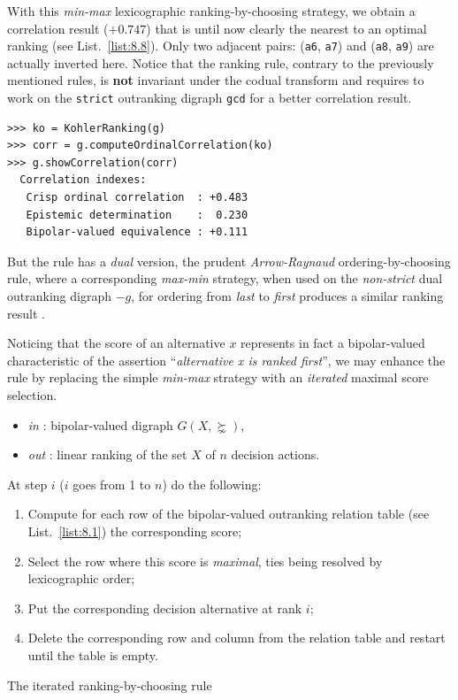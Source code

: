 With this \emph{min-max} lexicographic ranking-by-choosing strategy, we obtain a correlation result ($+0.747$) that is until now clearly the nearest to an optimal \Kemeny ranking (see List.~\vref{list:8.8}). Only two adjacent pairs: (\texttt{a6}, \texttt{a7}) and (\texttt{a8}, \texttt{a9}) are actually inverted here. Notice that the \Kohler ranking rule, contrary to the previously mentioned rules, is \textbf{not} invariant under the codual transform and requires to work on the \texttt{strict} outranking digraph \texttt{gcd} for a better correlation result.
\begin{lstlisting}
>>> ko = KohlerRanking(g)  
>>> corr = g.computeOrdinalCorrelation(ko)
>>> g.showCorrelation(corr)
  Correlation indexes:
   Crisp ordinal correlation  : +0.483
   Epistemic determination    :  0.230
   Bipolar-valued equivalence : +0.111
\end{lstlisting}

But the \Kohler rule has a \emph{dual} version, the prudent \emph{Arrow-Raynaud} ordering-by-choosing rule, where a corresponding \emph{max-min} strategy, when used on the \emph{non-strict} dual outranking digraph $-g$, for ordering from \emph{last} to \emph{first} produces a similar ranking result \citep{ARR-1986}.

Noticing that the \NetFlows score of an alternative $x$ represents in fact a bipolar-valued characteristic of the assertion ``\emph{alternative x is ranked first}'', we may enhance the \Kohler rule by replacing the simple \emph{min-max} strategy with an \emph{iterated} maximal \NetFlows score selection.

\begin{algorithm}
  {\footnotesize
\begin{itemize}
 \item [] \emph{in} : bipolar-valued digraph $G(X,\succnsim)$,
 \item [] \emph{out} : linear ranking of the set $X$ of $n$ decision actions.
\end{itemize}
At step $i$ ($i$ goes from 1 to $n$) do the following:
\begin{enumerate}[leftmargin=0.5cm,rightmargin=0.5cm,topsep=1pt]
\item Compute for each row of the bipolar-valued outranking relation table (see List.~\vref{list:8.1}) the corresponding \NetFlows score;
\item Select the row where this score is \emph{maximal}, ties being resolved by lexicographic order;
\item Put the corresponding decision alternative at rank $i$;
\item Delete the corresponding row and column from the relation table and restart until the table is empty.
\end{enumerate}
}
\caption{The iterated \NetFlows ranking-by-choosing rule}
\label{alg:8.4}
\end{algorithm}

